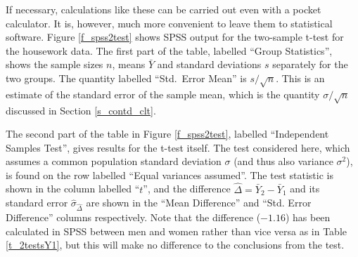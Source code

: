 \label{p_spss2a}
If necessary, calculations like these can be carried out even with a
pocket calculator. It is, however, much more convenient to leave them to
statistical software. Figure \ref{f_spss2test} shows
SPSS output for the two-sample t-test for the housework data.
The first part of the table, labelled ``Group
Statistics'', shows the sample sizes $n$, means $\bar{Y}$ and standard
deviations $s$ separately for the two groups. The quantity labelled
``Std.\ Error Mean'' is $s/\sqrt{n}$. This is an estimate
of the standard error of the sample mean, which is the quantity
$\sigma/\sqrt{n}$ discussed in Section \ref{s_contd_clt}.

The second part of the table in Figure \ref{f_spss2test}, labelled
``Independent Samples Test'', gives results for the t-test itself. The
test considered here, which assumes a common population standard
deviation $\sigma$ (and thus also variance $\sigma^{2}$), is found on
the row labelled ``Equal variances assumed''. The test statistic is
shown in the column labelled ``$t$'', and the difference
$\hat{\Delta}=\bar{Y}_{2}-\bar{Y}_{1}$ and its standard error
$\hat{\sigma}_{\hat{\Delta}}$ are shown in the ``Mean Difference'' and
``Std. Error Difference'' columns respectively.
Note that the difference ($-1.16$)
has been calculated in SPSS between men and women rather than vice versa
as in Table \ref{t_2testsY1}, but this will make no difference to the
conclusions from the test.

